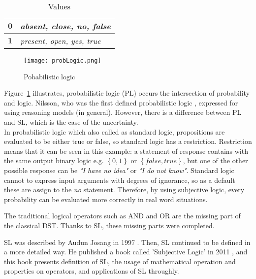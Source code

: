 \documentclass[a4,12pt]{ozu-thesis}
\begin{document}
\begin{table}[h]
\centering
\begin{tabular}{|r|l|}
  \hline
  $\mathbf{0}$ &  \textit{absent, close, no, false} \\
  \hline \hline
  $\mathbf{1}$ & \textit{present, open, yes, true} \\
  \hline
\end{tabular}
\caption{Values}
\label{table:values}
\end{table}




\begin{figure}[h]
\begin{center}
\texttt{[image: probLogic.png]}
\end{center}
\caption{Pobabilistic logic}
\label{fig:pl}
\end{figure}

Figure~\ref{fig:pl} illustrates, probabilistic logic (PL) occurs the intersection of probability and logic. Nilsson, who was the first defined probabilistic logic \cite{nilsson1986probabilistic}, expressed for using reasoning models (in general). However, there is a difference between PL and SL, which is the case of the uncertainty.
\\In probabilistic logic which also called as standard logic, propositions are evaluated to be either true or false, so standard logic has a restriction. Restriction means that it can be seen in this example: a statement of response contains with the same output binary logic e.g.  $\left \{ 0, 1 \right \}$ or  $ \left \{ false, true \right \}$, but one of the other possible response can be \textit{"I have no idea"} or \textit{"I do not know"}. Standard logic cannot to express input arguments with degrees of ignorance, so as a default these are assign to the \textit{no} statement. Therefore, by using subjective logic, every probability can be evaluated more correctly in real word situations.


The traditional logical operators such as AND and OR are the missing part of the classical DST. Thanks to SL, these missing parts were completed.


SL was described by Audun Josang in 1997 \cite{josang1997artificial}. Then, SL continued to be defined in a more detailed way. He published a book called 'Subjective Logic' in 2011 \cite{josang2011subjective}, and this book presents definition of SL, the usage of mathematical operation and properties on operators, and applications of SL throughly.
\end{document}
